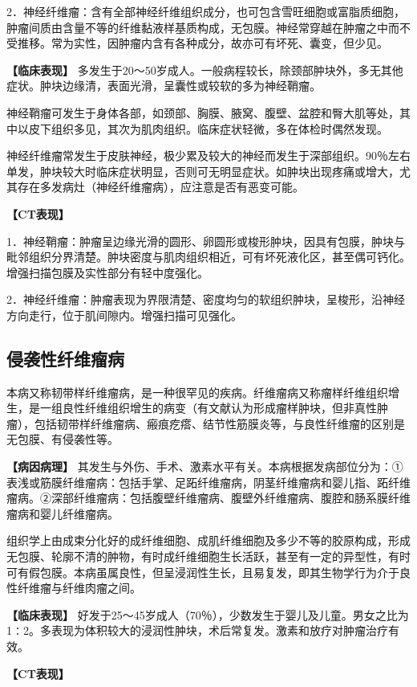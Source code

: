2．神经纤维瘤：含有全部神经纤维组织成分，也可包含雪旺细胞或富脂质细胞，肿瘤间质由含量不等的纤维黏液样基质构成，无包膜。神经常穿越在肿瘤之中而不受推移。常为实性，因肿瘤内含有各种成分，故亦可有坏死、囊变，但少见。

\textbf{【临床表现】}
多发生于20～50岁成人。一般病程较长，除颈部肿块外，多无其他症状。肿块边缘清，表面光滑，呈囊性或较软的多为神经鞘瘤。

神经鞘瘤可发生于身体各部，如颈部、胸膜、腋窝、腹壁、盆腔和臀大肌等处，其中以皮下组织多见，其次为肌肉组织。临床症状轻微，多在体检时偶然发现。

神经纤维瘤常发生于皮肤神经，极少累及较大的神经而发生于深部组织。90％左右单发，肿块较大时临床症状明显，否则可无明显症状。如肿块出现疼痛或增大，尤其存在多发病灶（神经纤维瘤病），应注意是否有恶变可能。

\textbf{【CT表现】}

1．神经鞘瘤：肿瘤呈边缘光滑的圆形、卵圆形或梭形肿块，因具有包膜，肿块与毗邻组织分界清楚。肿块密度与肌肉组织相近，可有坏死液化区，甚至偶可钙化。增强扫描包膜及实性部分有轻中度强化。

2．神经纤维瘤：肿瘤表现为界限清楚、密度均匀的软组织肿块，呈梭形，沿神经方向走行，位于肌间隙内。增强扫描可见强化。

\subsection{侵袭性纤维瘤病}

本病又称韧带样纤维瘤病，是一种很罕见的疾病。纤维瘤病又称瘤样纤维组织增生，是一组良性纤维组织增生的病变（有文献认为形成瘤样肿块，但非真性肿瘤），包括韧带样纤维瘤病、瘢痕疙瘩、结节性筋膜炎等，与良性纤维瘤的区别是无包膜、有侵袭性等。

\textbf{【病因病理】}
其发生与外伤、手术、激素水平有关。本病根据发病部位分为：①表浅或筋膜纤维瘤病：包括手掌、足跖纤维瘤病，阴茎纤维瘤病和婴儿指、跖纤维瘤病。②深部纤维瘤病：包括腹壁纤维瘤病、腹壁外纤维瘤病、腹腔和肠系膜纤维瘤病和婴儿纤维瘤病。

组织学上由成束分化好的成纤维细胞、成肌纤维细胞及多少不等的胶原构成，形成无包膜、轮廓不清的肿物，有时成纤维细胞生长活跃，甚至有一定的异型性，有时可有假包膜。本病虽属良性，但呈浸润性生长，且易复发，即其生物学行为介于良性纤维瘤与纤维肉瘤之间。

\textbf{【临床表现】}
好发于25～45岁成人（70％），少数发生于婴儿及儿童。男女之比为1∶2。多表现为体积较大的浸润性肿块，术后常复发。激素和放疗对肿瘤治疗有效。

\textbf{【CT表现】}


